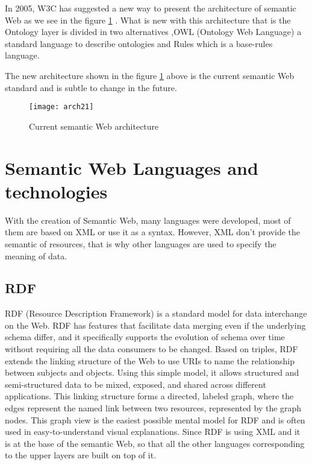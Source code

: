 
In 2005, W3C has suggested a new way to present the  architecture of semantic Web as we see in the figure  \ref{fig_archnew} . What is new with this architecture that is the Ontology layer is divided in two alternatives ,OWL (Ontology Web Language) a standard language to describe ontologies and Rules which is a base-rules language.

The new architecture shown in the figure \ref{fig_archnew} above is the current semantic Web standard and is subtle to change in the future.

\begin{figure}[H]
\centering
\texttt{[image: arch21]}
\caption{Current semantic Web architecture}
\label{fig_archnew}
\end{figure}





\section{Semantic Web Languages and technologies}
With the creation of Semantic Web, many languages were developed, most of them are based on XML or use it as a syntax. However, XML don't provide the semantic of resources, that is why other languages are used to specify the meaning of data.

\subsection{RDF}
RDF (Resource Description Framework) is a standard model for data interchange on the Web. RDF has features that facilitate data merging even if the underlying schema differ, and it specifically supports the evolution of schema over time without requiring all the data consumers to be changed.
Based on triples, RDF extends the linking structure of the Web to use URIs to name the relationship between subjects and objects. Using this simple model, it allows structured and semi-structured data to be mixed, exposed, and shared across different applications. This linking structure forms a directed, labeled graph, where the edges represent the named link between two resources, represented by the graph nodes. This graph view is the easiest possible mental model for RDF and is often used in easy-to-understand visual explanations.
Since RDF is using XML and it is at the base of the semantic Web, so that all the other languages corresponding to the upper layers are built on top of it.


